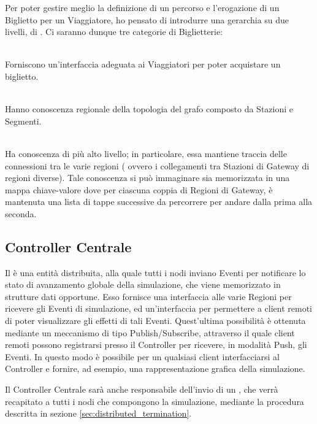 	Per poter gestire meglio la definizione di un percorso e l'erogazione di un Biglietto per un Viaggiatore, ho pensato di introdurre una gerarchia su due livelli, di . Ci saranno dunque tre categorie di Biglietterie:
		\begin{description}
			\item {} \\
			Forniscono un'interfaccia adeguata ai Viaggiatori per poter acquistare un biglietto.
			\item {}\\
			Hanno conoscenza regionale della topologia del grafo composto da Stazioni e Segmenti.
			\item {} \\ 
			Ha conoscenza di più alto livello; in particolare, essa mantiene traccia delle connessioni tra le varie regioni ( ovvero i collegamenti tra Stazioni di Gateway di regioni diverse). Tale conoscenza si può immaginare sia memorizzata in una mappa chiave-valore  dove per ciascuna coppia di Regioni di Gateway, è mantenuta una lista di tappe successive  da percorrere per andare dalla prima alla seconda.
		\end{description} 
	
	\subsection{Controller Centrale}
		
	Il  è una entità distribuita, alla quale tutti i nodi inviano Eventi per notificare lo stato di avanzamento globale della simulazione, che viene memorizzato in strutture dati opportune. Esso fornisce una interfaccia alle varie Regioni per ricevere gli Eventi di simulazione, ed un'interfaccia per permettere a client remoti di poter visualizzare gli effetti di tali Eventi. Quest'ultima possibilità è ottenuta mediante un meccanismo di tipo Publish/Subscribe, attraverso il quale client remoti possono registrarsi presso il Controller per ricevere, in modalità Push, gli Eventi.
	In questo modo è possibile per un qualsiasi client interfacciarsi al Controller e fornire, ad esempio, una rappresentazione grafica della simulazione.

	Il Controller Centrale sarà anche responsabile dell'invio di un , che verrà recapitato a tutti i nodi che compongono la simulazione, mediante la procedura descritta in sezione \ref{sec:distributed_termination}.
\newpage
